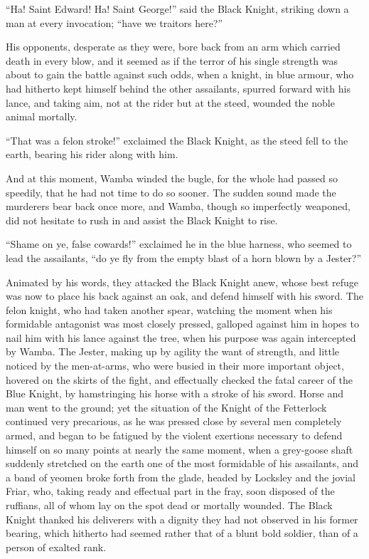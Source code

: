``Ha! Saint Edward! Ha! Saint George!'' said the Black Knight, striking
down a man at every invocation; ``have we traitors here?''

His opponents, desperate as they were, bore back from an arm which
carried death in every blow, and it seemed as if the terror of his
single strength was about to gain the battle against such odds, when a
knight, in blue armour, who had hitherto kept himself behind the other
assailants, spurred forward with his lance, and taking aim, not at the
rider but at the steed, wounded the noble animal mortally.

``That was a felon stroke!'' exclaimed the Black Knight, as the steed
fell to the earth, bearing his rider along with him.

And at this moment, Wamba winded the bugle, for the whole had passed so
speedily, that he had not time to do so sooner. The sudden sound made
the murderers bear back once more, and Wamba, though so imperfectly
weaponed, did not hesitate to rush in and assist the Black Knight to
rise.

``Shame on ye, false cowards!'' exclaimed he in the blue harness, who
seemed to lead the assailants, ``do ye fly from the empty blast of a
horn blown by a Jester?''

Animated by his words, they attacked the Black Knight anew, whose best
refuge was now to place his back against an oak, and defend himself with
his sword. The felon knight, who had taken another spear, watching the
moment when his formidable antagonist was most closely pressed, galloped
against him in hopes to nail him with his lance against the tree, when
his purpose was again intercepted by Wamba. The Jester, making up by
agility the want of strength, and little noticed by the men-at-arms, who
were busied in their more important object, hovered on the skirts of the
fight, and effectually checked the fatal career of the Blue Knight, by
hamstringing his horse with a stroke of his sword. Horse and man went to
the ground; yet the situation of the Knight of the Fetterlock continued
very precarious, as he was pressed close by several men completely
armed, and began to be fatigued by the violent exertions necessary to
defend himself on so many points at nearly the same moment, when a
grey-goose shaft suddenly stretched on the earth one of the most
formidable of his assailants, and a band of yeomen broke forth from the
glade, headed by Locksley and the jovial Friar, who, taking ready and
effectual part in the fray, soon disposed of the ruffians, all of whom
lay on the spot dead or mortally wounded. The Black Knight thanked his
deliverers with a dignity they had not observed in his former bearing,
which hitherto had seemed rather that of a blunt bold soldier, than of a
person of exalted rank.

